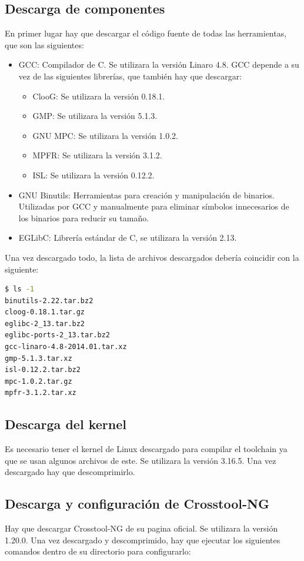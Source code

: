 \documentclass{tfg}
\begin{document}
\subsection{Descarga de componentes}
En primer lugar hay que descargar el código fuente de todas las herramientas, que son las siguientes:
\begin{itemize}
	\item GCC: Compilador de C. Se utilizara la versión Linaro 4.8. GCC depende a su vez de las siguientes
	librerías, que también hay que descargar:
	\begin{itemize}
		\item ClooG: Se utilizara la versión 0.18.1.
		\item GMP: Se utilizara la versión 5.1.3.
		\item GNU MPC: Se utilizara la versión 1.0.2.
		\item MPFR: Se utilizara la versión 3.1.2.
		\item ISL: Se utilizara la versión 0.12.2.
	\end{itemize}
	\item GNU Binutils: Herramientas para creación y manipulación de binarios. Utilizadas por GCC y manualmente para
	eliminar símbolos innecesarios de los binarios para reducir su tamaño.
	\item EGLibC: Librería estándar de C, se utilizara la versión 2.13.
\end{itemize}

Una vez descargado todo, la lista de archivos descargados debería coincidir con
la siguiente:

\begin{lstlisting}[language=bash,caption=Lista de tarballs del toolchain]
$ ls -1
binutils-2.22.tar.bz2
cloog-0.18.1.tar.gz
eglibc-2_13.tar.bz2
eglibc-ports-2_13.tar.bz2
gcc-linaro-4.8-2014.01.tar.xz
gmp-5.1.3.tar.xz
isl-0.12.2.tar.bz2
mpc-1.0.2.tar.gz
mpfr-3.1.2.tar.xz
\end{lstlisting}
%

\subsection{Descarga del kernel}
Es necesario tener el kernel de Linux descargado para compilar el toolchain ya que se usan algunos
archivos de este. Se utilizara la versión 3.16.5. Una vez descargado hay que descomprimirlo.

\subsection{Descarga y configuración de Crosstool-NG}
Hay que descargar Crosstool-NG de su pagina oficial. Se utilizara la versión
1.20.0. Una vez descargado y descomprimido, hay que ejecutar los siguientes
comandos dentro de su directorio para configurarlo:
\end{document}
